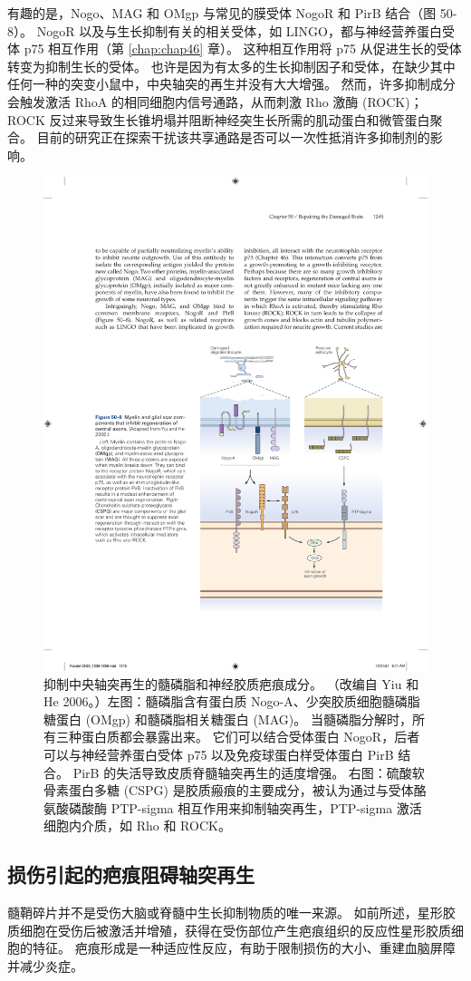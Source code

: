 有趣的是，Nogo、MAG 和 OMgp 与常见的膜受体 NogoR 和 PirB 结合（图 50-8）。 
NogoR 以及与生长抑制有关的相关受体，如 LINGO，都与神经营养蛋白受体 p75 相互作用（第 \ref{chap:chap46} 章）。 这种相互作用将 p75 从促进生长的受体转变为抑制生长的受体。 也许是因为有太多的生长抑制因子和受体，在缺少其中任何一种的突变小鼠中，中央轴突的再生并没有大大增强。 然而，许多抑制成分会触发激活 RhoA 的相同细胞内信号通路，从而刺激 Rho 激酶 (ROCK)； ROCK 反过来导致生长锥坍塌并阻断神经突生长所需的肌动蛋白和微管蛋白聚合。 目前的研究正在探索干扰该共享通路是否可以一次性抵消许多抑制剂的影响。

\begin{figure}[htbp]
	\centering
	\includegraphics[width=0.7\linewidth]{chap50/fig_50_8}
	\caption{抑制中央轴突再生的髓磷脂和神经胶质疤痕成分。 （改编自 Yiu 和 He 2006。）左图：髓磷脂含有蛋白质 Nogo-A、少突胶质细胞髓磷脂糖蛋白 (OMgp) 和髓磷脂相关糖蛋白 (MAG)。 当髓磷脂分解时，所有三种蛋白质都会暴露出来。 它们可以结合受体蛋白 NogoR，后者可以与神经营养蛋白受体 p75 以及免疫球蛋白样受体蛋白 PirB 结合。 PirB 的失活导致皮质脊髓轴突再生的适度增强。 右图：硫酸软骨素蛋白多糖 (CSPG) 是胶质瘢痕的主要成分，被认为通过与受体酪氨酸磷酸酶 PTP-sigma 相互作用来抑制轴突再生，PTP-sigma 激活细胞内介质，如 Rho 和 ROCK。}
	\label{fig:50_8}
\end{figure}

\subsection{损伤引起的疤痕阻碍轴突再生}
髓鞘碎片并不是受伤大脑或脊髓中生长抑制物质的唯一来源。 如前所述，星形胶质细胞在受伤后被激活并增殖，获得在受伤部位产生疤痕组织的反应性星形胶质细胞的特征。 疤痕形成是一种适应性反应，有助于限制损伤的大小、重建血脑屏障并减少炎症。

